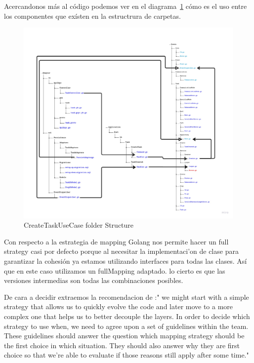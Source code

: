 Acercandonos más al código podemos ver en el diagrama~\cref{fig:createTaskUseCaseArchitectureFolderStructure} cómo es el uso entre los componentes que exísten en la estructrura de carpetas.

\begin{figure}[H]
    \centering
    \includegraphics[height=0.5\textheight]{./part/Ejecucion/Seguimiento/CreateTaskUseCase/img/PFM - CreateUseCaseFolderStructure}
    \caption{CreateTaskUseCase folder Structure}\label{fig:createTaskUseCaseArchitectureFolderStructure}
\end{figure}

Con respecto a la estrategia de mapping Golang nos permite hacer un full strategy casi por defecto porque al necesitar la implementaci'on de clase para garantizar la cohesión ya estamos utilizando interfaces para todas las clases. Así que en este caso utilizamos un fullMapping adaptado. lo cierto es que las versiones intermedias son todas las combinaciones posibles.

De cara a decidir extraemos la recomendacion de  \cite{TomHombergs2019GYHD}:"
we might start with a simple strategy that allows us to quickly evolve the code and later move to a more complex one that helps us to better decouple the layers.
In order to decide which strategy to use when, we need to agree upon a set of guidelines within the team. These guidelines should answer the question which mapping strategy should be the first choice in which situation. They should also answer why they are first choice so that we’re able to evaluate if those reasons still apply after some time."

